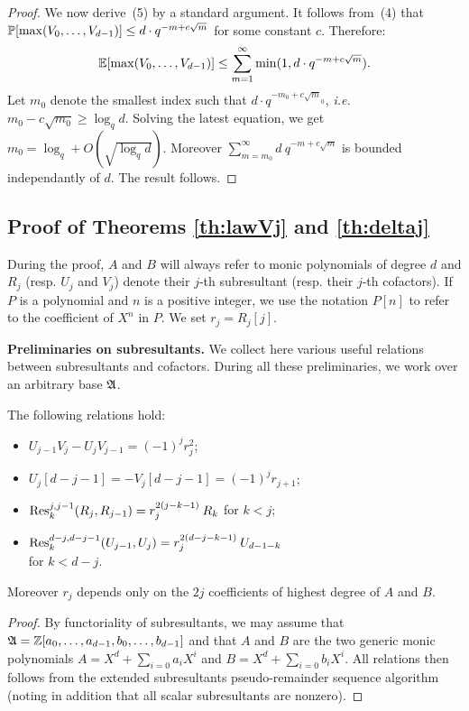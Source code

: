 \documentclass{sig-alternate}
\begin{document}
\begin{proof}
We now derive~(5) by a standard argument. It follows from~(4) that
$\P[\max(V_0, \ldots, V_{d-1})] \leq d \cdot q^{-m + c\sqrt m}$
for some constant $c$. Therefore:
$$\E[\max(V_0, \ldots, V_{d-1})] \leq \sum_{m=1}^\infty \min(1,
d \cdot q^{-m + c\sqrt m}).$$
Let $m_0$ denote the smallest index such that $d \cdot q^{-m_0 + c\sqrt 
m_0}$, \emph{i.e.} $m_0 - c \sqrt{m_0} \geq \log_q d$. Solving the latest
equation, we get $m_0 = \log_q + O(\sqrt{\log_q d})$. Moreover
$\sum_{m=m_0}^\infty d\: q^{-m + c\sqrt m}$ is bounded independantly of
$d$. The result follows.
\end{proof}

\subsection{Proof of Theorems \ref{th:lawVj} and \ref{th:deltaj}}
\label{subsec:proof}

During the proof, $A$ and $B$ will always refer to monic polynomials of 
degree $d$ and $R_j$ (resp. $U_j$ and $V_j$) denote their $j$-th 
subresultant (resp. their $j$-th cofactors). If $P$ is a polynomial and 
$n$ is a positive integer, we use the notation $P[n]$ to refer to the 
coefficient of $X^n$ in $P$. We set $r_j = R_j[j]$.

\medskip

\noindent
\textbf{Preliminaries on subresultants.}
We collect here various useful relations between subresultants and 
cofactors. During all these preliminaries, we work over an arbitrary
base $\ring$.

\begin{prop}
\label{prop:relations}
The following relations hold:
\begin{itemize}
\setlength\itemsep{0.1em}
\item $U_{j-1} V_j - U_j V_{j-1} = (-1)^j r_j^2$;
\item $U_j[d{-}j{-}1] = -V_j[d{-}j{-}1] = (-1)^j r_{j+1}$;
\item $\Res^{j,j-1}_k(R_j, R_{j-1}) = r_j^{2(j-k-1)} \: R_k$ for $k < j$;
\item $\Res^{d-j,d-j-1}_k(U_{j-1}, U_j) = r_j^{2(d-j-k-1)} \: U_{d-1-k}$\\
for $k < d-j$.
\end{itemize}
Moreover $r_j$ depends only on the $2j$ coefficients of highest 
degree of $A$ and $B$.
\end{prop}

\begin{proof}
By functoriality of subresultants, we may assume that $\ring = 
\Z[a_0, \ldots, a_{d-1}, b_0, \ldots, b_{d-1}]$ and that $A$ and $B$
are the two generic monic polynomials 
$A = X^d + \sum_{i=0} a_i X^i$ and
$B = X^d + \sum_{i=0} b_i X^i$.
All relations then follows from the extended subresultants 
pseudo-remainder sequence algorithm (noting in addition that all
scalar subresultants are nonzero).
\end{proof}
\end{document}
